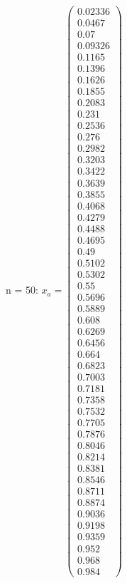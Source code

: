 \documentclass{udpreport}
\begin{document}
\begin{enumerate}
\begin {enumerate}
\begin{enumerate}
\begin{itemize}
\begin{itemize}
				n = 50: $x_{a} = \left(\begin{array}{c} 0.02336\\ 0.0467\\ 0.07\\ 0.09326\\ 0.1165\\ 0.1396\\ 0.1626\\ 0.1855\\ 0.2083\\ 0.231\\ 0.2536\\ 0.276\\ 0.2982\\ 0.3203\\ 0.3422\\ 0.3639\\ 0.3855\\ 0.4068\\ 0.4279\\ 0.4488\\ 0.4695\\ 0.49\\ 0.5102\\ 0.5302\\ 0.55\\ 0.5696\\ 0.5889\\ 0.608\\ 0.6269\\ 0.6456\\ 0.664\\ 0.6823\\ 0.7003\\ 0.7181\\ 0.7358\\ 0.7532\\ 0.7705\\ 0.7876\\ 0.8046\\ 0.8214\\ 0.8381\\ 0.8546\\ 0.8711\\ 0.8874\\ 0.9036\\ 0.9198\\ 0.9359\\ 0.952\\ 0.968\\ 0.984 \end{array}\right)$

\end{itemize}
\end{itemize}
\end{enumerate}
\end{enumerate}
\end{enumerate}
\end{document}
